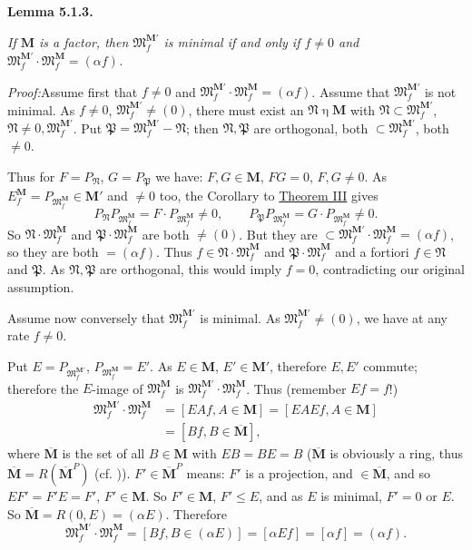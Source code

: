 \documentclass[12pt,b5paper,twoside]{article}
\newcommand{\M}{\mathbf M}
\newcommand{\Lemma}[1]{%
  \par\smallskip\noindent\phantomsection\label{lem:#1}\textbf{Lemma #1.}\enspace
}
\newcommand{\Proof}{\par\noindent\textit{Proof:}\enspace}
\newcommand{\thmref}[1]{\hyperref[thm:#1]{Theorem #1}}
\begin{document}
\Lemma{5.1.3}
\emph{If $\M$ is a factor, then $\mathfrak M_f^{\M'}$ is minimal if and only
if $f\neq0$ and
$\mathfrak M_f^{\M'}\cdot\mathfrak M_f^{\M}=(\alpha f)$.}

\Proof Assume first that $f\neq0$ and
$\mathfrak M_f^{\M'}\cdot\mathfrak M_f^{\M}=(\alpha f)$. Assume that
$\mathfrak M_f^{\M'}$ is not minimal. As $f\neq0$,
$\mathfrak M_f^{\M'}\neq(0)$, there must exist an
$\mathfrak N\mathrel\eta\M$ with
$\mathfrak N\subset\mathfrak M_f^{\M'}$,
$\mathfrak N\neq0,\mathfrak M_f^{\M'}$. Put
$\mathfrak P=\mathfrak M_f^{\M'}-\mathfrak N$; then $\mathfrak N,\mathfrak P$
are orthogonal, both $\subset\mathfrak M_f^{\M'}$, both $\neq0$.

Thus for $F=P_{\mathfrak N}$, $G=P_{\mathfrak P}$ we have:
$F,G\in\M$, $FG=0$, $F,G\neq0$. As
$E_f^{\M}=P_{\mathfrak M_f^{\M}}\in\M'$ and $\neq0$ too, the Corollary to
\thmref{III} gives
\[
 P_{\mathfrak N}P_{\mathfrak M_f^{\M}}
 =F\cdot P_{\mathfrak M_f^{\M}}\neq0,
 \qquad
 P_{\mathfrak P}P_{\mathfrak M_f^{\M}}
 =G\cdot P_{\mathfrak M_f^{\M}}\neq0.
\]
So $\mathfrak N\cdot\mathfrak M_f^{\M}$ and
$\mathfrak P\cdot\mathfrak M_f^{\M}$ are both $\neq(0)$. But they are
$\subset\mathfrak M_f^{\M'}\cdot\mathfrak M_f^{\M}=(\alpha f)$, so they
are both $=(\alpha f)$. Thus
$f\in\mathfrak N\cdot\mathfrak M_f^{\M}$ and
$\mathfrak P\cdot\mathfrak M_f^{\M}$ and a fortiori
$f\in\mathfrak N$ and $\mathfrak P$. As $\mathfrak N,\mathfrak P$ are
orthogonal, this would imply $f=0$, contradicting our original assumption.

Assume now conversely that $\mathfrak M_f^{\M'}$ is minimal. As
$\mathfrak M_f^{\M'}\neq(0)$, we have at any rate $f\neq0$.

Put $E=P_{\mathfrak M_f^{\M'}}$, $P_{\mathfrak M_f^{\M}}=E'$. As
$E\in\M$, $E'\in\M'$, therefore
$E,E'$ commute; therefore the $E$-image of $\mathfrak M_f^{\M}$ is
$\mathfrak M_f^{\M'}\cdot\mathfrak M_f^{\M}$. Thus (remember $Ef=f$!)
\begin{align*}
 \mathfrak M_f^{\M'}\cdot\mathfrak M_f^{\M}
 &=[EAf,A\in\M]=[EAEf,A\in\M]\\
 &=[Bf,B\in\overline{\M}],
\end{align*}
where $\overline{\M}$ is the set of all $B\in\M$ with $EB=BE=B$
($\overline{\M}$ is obviously a ring, thus
$\overline{\M}=R(\overline{\M}^P)$ (cf. \cite[p.~392]{ref18})).
$F'\in\overline{\M}^P$ means: $F'$ is a projection, and
$\in\overline{\M}$, and so
$EF'=F'E=F'$, $F'\in\M$. So $F'\in\M$, $F'\leq E$, and as $E$ is minimal,
$F'=0$ or $E$. So $\overline{\M}=R(0,E)=(\alpha E)$. Therefore
\[
 \mathfrak M_f^{\M'}\cdot\mathfrak M_f^{\M}
 =[Bf,B\in(\alpha E)]=[\alpha Ef]=[\alpha f]=(\alpha f).
\]
\end{document}
